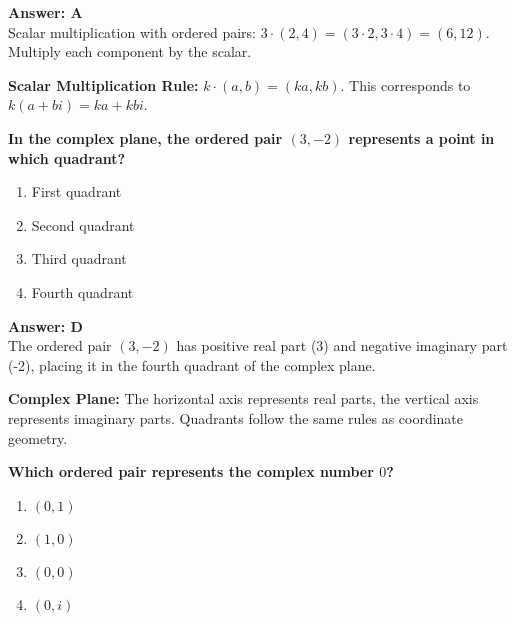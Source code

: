 \documentclass[12pt,a4paper]{article}
\begin{document}
\begin{answerstyle}
\textbf{Answer: A} \\
Scalar multiplication with ordered pairs: \( 3 \cdot (2, 4) = (3 \cdot 2, 3 \cdot 4) = (6, 12) \). Multiply each component by the scalar.
\end{answerstyle}

\begin{conceptbox}
\textbf{Scalar Multiplication Rule:} \( k \cdot (a, b) = (ka, kb) \). This corresponds to \( k(a + bi) = ka + kbi \).
\end{conceptbox}

\newpage
\begin{questiontitle}[MCQ 52]
\textbf{In the complex plane, the ordered pair \( (3, -2) \) represents a point in which quadrant?}
\end{questiontitle}

\begin{partbox}[Options]
\begin{enumerate}[label=\Alph*.]
    \item First quadrant
    \item Second quadrant
    \item Third quadrant
    \item Fourth quadrant
\end{enumerate}
\end{partbox}

\begin{answerstyle}
\textbf{Answer: D} \\
The ordered pair \( (3, -2) \) has positive real part (3) and negative imaginary part (-2), placing it in the fourth quadrant of the complex plane.
\end{answerstyle}

\begin{conceptbox}
\textbf{Complex Plane:} The horizontal axis represents real parts, the vertical axis represents imaginary parts. Quadrants follow the same rules as coordinate geometry.
\end{conceptbox}

\newpage
\begin{questiontitle}[MCQ 53]
\textbf{Which ordered pair represents the complex number \( 0 \)?}
\end{questiontitle}

\begin{partbox}[Options]
\begin{enumerate}[label=\Alph*.]
    \item \( (0, 1) \)
    \item \( (1, 0) \)
    \item \( (0, 0) \)
    \item \( (0, i) \)
\end{enumerate}
\end{partbox}
\end{document}

